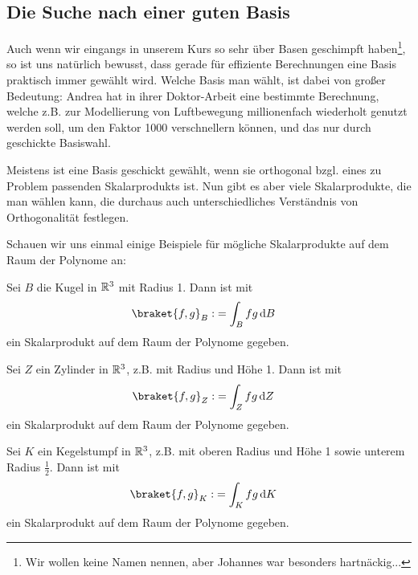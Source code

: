 \subsection{Die Suche nach einer guten Basis}
Auch wenn wir eingangs in unserem Kurs so sehr über Basen geschimpft haben\footnote{Wir wollen keine Namen nennen, aber Johannes war besonders hartnäckig...}, so ist uns natürlich bewusst, dass gerade für effiziente Berechnungen eine Basis praktisch immer gewählt wird. Welche Basis man wählt, ist dabei von großer Bedeutung: Andrea hat in ihrer Doktor-Arbeit eine bestimmte Berechnung, welche z.B. zur Modellierung von Luftbewegung millionenfach wiederholt genutzt werden soll, um den Faktor 1000 verschnellern können, und das nur durch geschickte Basiswahl. 

\begin{remark}
	Meistens ist eine Basis geschickt gewählt, wenn sie orthogonal bzgl. eines zu Problem passenden Skalarprodukts ist. Nun gibt es aber viele Skalarprodukte, die man wählen kann, die durchaus auch unterschiedliches Verständnis von Orthogonalität festlegen.
\end{remark}
Schauen wir uns einmal einige Beispiele für mögliche Skalarprodukte auf dem Raum der Polynome an:
\begin{example}
	Sei $B$ die Kugel in $\mathbb{R}^3$ mit Radius 1. Dann ist mit
	\begin{align*}
		\braket{f,g}_B :&= \int_B f g \dd B
	\end{align*}
	ein Skalarprodukt auf dem Raum der Polynome gegeben.
\end{example}

\begin{example}
	Sei $Z$ ein Zylinder in $\mathbb{R}^3$, z.B. mit Radius und Höhe 1. Dann ist mit
	\begin{align*}
		\braket{f,g}_Z :&= \int_Z f g \dd Z
	\end{align*}
	ein Skalarprodukt auf dem Raum der Polynome gegeben.
\end{example}

\begin{example}
	Sei $K$ ein Kegelstumpf in $\mathbb{R}^3$, z.B. mit oberen Radius und Höhe 1 sowie unterem Radius $\frac{1}{2}$. Dann ist mit
	\begin{align*}
		\braket{f,g}_K :&= \int_K f g \dd K
	\end{align*}
	ein Skalarprodukt auf dem Raum der Polynome gegeben.
\end{example}

